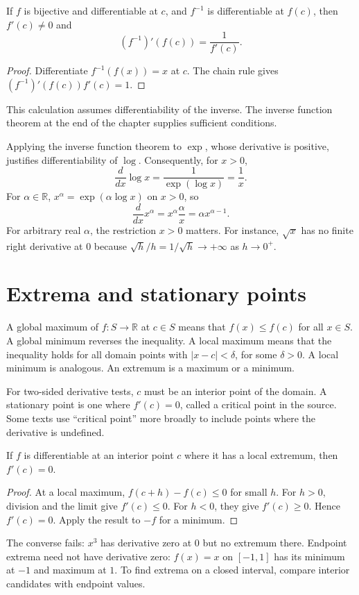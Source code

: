 \begin{proposition}
If $f$ is bijective and differentiable at $c$, and $f^{-1}$ is differentiable
at $f(c)$, then $f'(c)\ne0$ and
\[
(f^{-1})'(f(c))=\frac1{f'(c)}.
\]
\end{proposition}
\begin{proof}
Differentiate $f^{-1}(f(x))=x$ at $c$. The chain rule gives
$(f^{-1})'(f(c))f'(c)=1$.
\end{proof}
This calculation assumes differentiability of the inverse. The inverse
function theorem at the end of the chapter supplies sufficient conditions.

\begin{example}
Applying the inverse function theorem to $\exp$, whose derivative is
positive, justifies differentiability of $\log$. Consequently, for $x>0$,
\[
\frac d{dx}\log x=\frac1{\exp(\log x)}=\frac1x.
\]
For $\alpha\in\mathbb R$, $x^\alpha=\exp(\alpha\log x)$ on $x>0$, so
\[
\frac d{dx}x^\alpha=x^\alpha\frac\alpha x=\alpha x^{\alpha-1}.
\]
For arbitrary real $\alpha$, the restriction $x>0$ matters. For instance,
$\sqrt x$ has no finite right derivative at $0$ because
$\sqrt h/h=1/\sqrt h\to+\infty$ as $h\to0^+$.
\end{example}

\section{Extrema and stationary points}
\begin{definition}
A global maximum of $f:S\to\mathbb R$ at $c\in S$ means that $f(x)\leq f(c)$
for all $x\in S$. A global minimum reverses the inequality.
A local maximum means that the inequality holds for all domain points
with $|x-c|<\delta$, for some $\delta>0$. A local minimum is analogous.
An extremum is a maximum or a minimum.
\end{definition}
For two-sided derivative tests, $c$ must be an interior point of the domain.
A stationary point is one where $f'(c)=0$, called a critical point in the
source. Some texts use ``critical point'' more broadly to include points
where the derivative is undefined.

\begin{theorem}
If $f$ is differentiable at an interior point $c$ where it has a local
extremum, then $f'(c)=0$.
\end{theorem}
\begin{proof}
At a local maximum, $f(c+h)-f(c)\leq0$ for small $h$.
For $h>0$, division and the limit give $f'(c)\leq0$.
For $h<0$, they give $f'(c)\geq0$. Hence $f'(c)=0$.
Apply the result to $-f$ for a minimum.
\end{proof}
The converse fails: $x^3$ has derivative zero at $0$ but no extremum there.
Endpoint extrema need not have derivative zero: $f(x)=x$ on $[-1,1]$ has
its minimum at $-1$ and maximum at $1$. To find extrema on a closed interval,
compare interior candidates with endpoint values.

